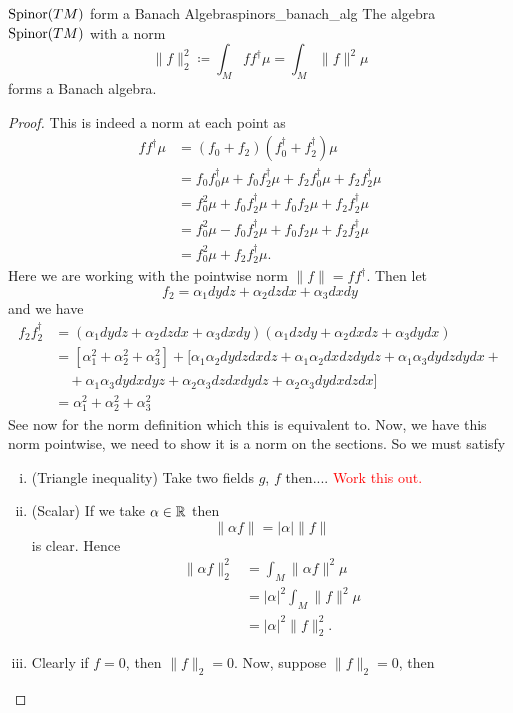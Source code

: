 \begin{prop}{$\mathrm{Spinor}(TM)$ form a Banach Algebra}{spinors_banach_alg}
The algebra $\mathrm{Spinor}(TM)$ with a norm 
\[
\|f\|_2^2 \coloneqq \int_M ff^\dagger \mu = \int_M \|f\|^2 \mu
\]
forms a Banach algebra.
\tcblower
\begin{proof}
This is indeed a norm at each point as
\begin{align*}
ff^\dagger \mu  &= (f_0 + f_2)(f_0^\dagger+f_2^\dagger)\mu\\
&= f_0 f_0^\dagger \mu + f_0 f_2^\dagger \mu+ f_2 f_0^\dagger \mu + f_2 f_2^\dagger \mu \\
&= f_0^2 \mu + f_0 f_2^\dagger \mu + f_0 f_2 \mu + f_2f_2^\dagger \mu\\
&= f_0^2 \mu - f_0 f_2^\dagger \mu + f_0 f_2 \mu + f_2 f_2^\dagger \mu\\
&= f_0^2 \mu + f_2f_2^\dagger \mu.
\end{align*}
Here we are working with the pointwise norm $\|f\|=ff^\dagger$.  Then let
\[
f_2 = \alpha_1 dydz + \alpha_2 dzdx + \alpha_3 dxdy
\]
and we have
\begin{align*}
    f_2 f_2^\dagger &= (\alpha_1 dydz + \alpha_2 dzdx + \alpha_3 dxdy)(\alpha_1 dzdy + \alpha_2 dxdz + \alpha_3 dydx)\\
    &= [\alpha_1^2 + \alpha_2^2 + \alpha_3^2] +[ \alpha_1 \alpha_2 dydzdxdz + \alpha_1 \alpha_2 dxdzdydz + \alpha_1\alpha_3 dydzdydx + \\
    &\quad +\alpha_1\alpha_3 dydxdyz + \alpha_2 \alpha_3 dzdxdydz + \alpha_2 \alpha_3 dydxdzdx] \\
    &= \alpha_1^2 + \alpha_2^2 + \alpha_3^2 
\end{align*}
See now \cite{hestenes_classical_mechanics} for the norm definition which this is equivalent to.  Now, we have this norm pointwise, we need to show it is a norm on the sections.  So we must satisfy
\begin{enumerate}[(i)]
    \item (Triangle inequality) Take two fields $g$, $f$ then.... \textcolor{red}{Work this out.}
    \item (Scalar) If we take $\alpha \in \mathbb{R}$ then
    \[
    \|\alpha f\| = |\alpha|\|f\|
    \]
    is clear. Hence
    \begin{align*}
    \|\alpha f\|_2^2 &= \int_M \|\alpha f\|^2 \mu\\
    &= |\alpha|^2\int_M \|f\|^2 \mu\\
    &= |\alpha|^2 \|f\|_2^2.
    \end{align*}
    \item Clearly if $f=0$, then $\|f\|_2=0$. Now, suppose $\|f\|_2=0$, then

\end{enumerate}
\end{proof}
\end{prop}
